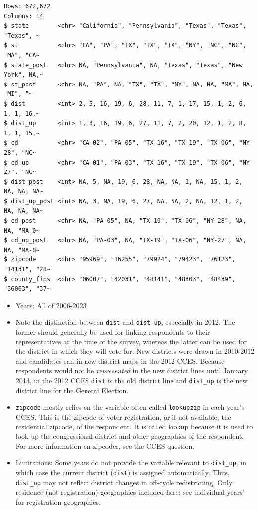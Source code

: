 \documentclass[10pt,article,oneside]{memoir}
\theoremstyle{definition}
\begin{document}
\begin{verbatim}
Rows: 672,672
Columns: 14
$ state        <chr> "California", "Pennsylvania", "Texas", "Texas", "Texas", ~
$ st           <chr> "CA", "PA", "TX", "TX", "TX", "NY", "NC", "NC", "MA", "CA~
$ state_post   <chr> NA, "Pennsylvania", NA, "Texas", "Texas", "New York", NA,~
$ st_post      <chr> NA, "PA", NA, "TX", "TX", "NY", NA, NA, "MA", NA, "MI", "~
$ dist         <int> 2, 5, 16, 19, 6, 28, 11, 7, 1, 17, 15, 1, 2, 6, 1, 1, 16,~
$ dist_up      <int> 1, 3, 16, 19, 6, 27, 11, 7, 2, 20, 12, 1, 2, 8, 1, 1, 15,~
$ cd           <chr> "CA-02", "PA-05", "TX-16", "TX-19", "TX-06", "NY-28", "NC~
$ cd_up        <chr> "CA-01", "PA-03", "TX-16", "TX-19", "TX-06", "NY-27", "NC~
$ dist_post    <int> NA, 5, NA, 19, 6, 28, NA, NA, 1, NA, 15, 1, 2, NA, NA, NA~
$ dist_up_post <int> NA, 3, NA, 19, 6, 27, NA, NA, 2, NA, 12, 1, 2, NA, NA, NA~
$ cd_post      <chr> NA, "PA-05", NA, "TX-19", "TX-06", "NY-28", NA, NA, "MA-0~
$ cd_up_post   <chr> NA, "PA-03", NA, "TX-19", "TX-06", "NY-27", NA, NA, "MA-0~
$ zipcode      <chr> "95969", "16255", "79924", "79423", "76123", "14131", "28~
$ county_fips  <chr> "06007", "42031", "48141", "48303", "48439", "36063", "37~
\end{verbatim}

\begin{itemize}
\tightlist
\item
  Years: All of 2006-2023
\item
  Note the distinction between \texttt{dist} and \texttt{dist\_up},
  especially in 2012. The former should generally be used for linking
  respondents to their representatives at the time of the survey,
  whereas the latter can be used for the district in which they will
  vote for. New districts were drawn in 2010-2012 and candidates ran in
  new district maps in the 2012 CCES. Because respondents would not be
  \emph{represented} in the new district lines until January 2013, in
  the 2012 CCES \texttt{dist} is the old district line and
  \texttt{dist\_up} is the new district line for the General Election.
\item
  \texttt{zipcode} mostly relies on the variable often called
  \texttt{lookupzip} in each year's CCES. This is the zipcode of voter
  registration, or if not available, the residential zipcode, of the
  respondent. It is called lookup because it is used to look up the
  congressional district and other geographies of the respondent. For
  more information on zipcodes, see the CCES question.
\item
  Limitations: Some years do not provide the variable relevant to
  \texttt{dist\_up}, in which case the current district (\texttt{dist})
  is assigned automatically. Thus, \texttt{dist\_up} may not reflect
  district changes in off-cycle redistricting. Only residence (not
  registration) geographies included here; see individual years' for
  registration geographies.
\end{itemize}
\end{document}
